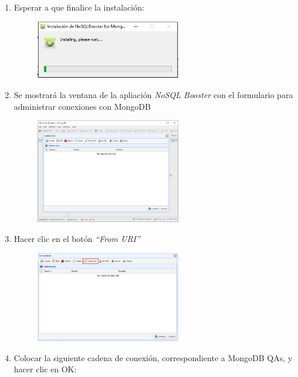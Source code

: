 \documentclass[a4paper,11pt]{paper}
\begin{document}
\begin{enumerate}
\newpage
\item
  Esperar a que finalice la instalación:

  \begin{figure}[!h]
  \centering
  \includegraphics[width=0.6\textwidth]{imgs/instalacion/BoosterInstall2.png}
  \end{figure}
\item
  Se mostrará la ventana de la apliación \emph{NoSQL Booster} con el
  formulario para administrar conexiones con MongoDB

  \begin{figure}[!h]
  \centering
  \includegraphics[width=0.6\textwidth]{imgs/instalacion/BoosterFinal.png}
  \end{figure}
\item
  Hacer clic en el botón \emph{``From URI''}

  \begin{figure}[!h]
  \centering
  \includegraphics[width=0.6\textwidth]{imgs/instalacion/Conexion1.png}
  \end{figure}

\newpage
\item
  Colocar la siguiente cadena de conexión, correspondiente a MongoDB
  QAs, y hacer clic en OK:
\end{enumerate}
\end{document}
